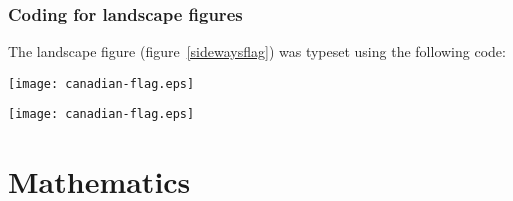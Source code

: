 \documentclass{cje}          %
\theoremstyle{plain}%
\theoremstyle{definition}
\theoremstyle{remark}
\begin{document}
\subsubsection{Coding for landscape figures}
\label{landfigures}

The landscape figure (figure~\ref{sidewaysflag}) was typeset using the following code:
\begin{smallverbatim}
\begin{sidewaysfigure}%
\texttt{[image: canadian-flag.eps]}
  \caption{The national flag of Canada}
\label{sidewaysflag}
\end{sidewaysfigure}
\end{smallverbatim}
\begin{sidewaysfigure}%
\texttt{[image: canadian-flag.eps]}
  \caption{The national flag of Canada}
\label{sidewaysflag}
\end{sidewaysfigure}



\section{Mathematics}
\end{document}
